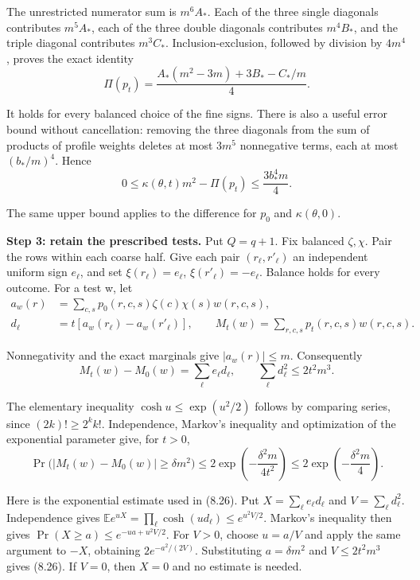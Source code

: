 \documentclass[english,11pt,a4paper]{article}
\begin{document}
The unrestricted numerator sum is \(m^6A_*\). Each of the three single diagonals contributes \(m^5A_*\), each of the three double diagonals contributes \(m^4B_*\), and the triple diagonal contributes \(m^3C_*\). Inclusion-exclusion, followed by division by \(4m^4\), proves the exact identity
\[\Pi(p_t)=\frac{A_*(m^2-3m)+3B_*-C_*/m}{4}.                 \tag{8.23}\]

It holds for every balanced choice of the fine signs. There is also a useful error bound without cancellation: removing the three diagonals from the sum of products of profile weights deletes at most \(3m^5\) nonnegative terms, each at most \((b_*/m)^4\). Hence
\[0\leq\kappa(\theta,t)m^2-\Pi(p_t)\leq\frac{3b_*^4m}{4}.    \tag{8.24}\]

The same upper bound applies to the difference for \(p_0\) and \(\kappa(\theta,0)\).

\textbf{Step 3: retain the prescribed tests.} Put \(Q=q+1\). Fix balanced \(\zeta,\chi\). Pair the rows within each coarse half. Give each pair \((r_\ell,r'_\ell)\) an independent uniform sign \(e_\ell\), and set \(\xi(r_\ell)=e_\ell\), \(\xi(r'_\ell)=-e_\ell\). Balance holds for every outcome. For a test w, let
\[\begin{aligned}
a_w(r)&=\sum_{c,s}p_0(r,c,s)\zeta(c)\chi(s)w(r,c,s),\\
d_\ell&=t[a_w(r_\ell)-a_w(r'_\ell)],\qquad
M_t(w)=\sum_{r,c,s}p_t(r,c,s)w(r,c,s).
\end{aligned}\]

Nonnegativity and the exact marginals give \(|a_w(r)|\leq m\). Consequently
\[M_t(w)-M_0(w)=\sum_\ell e_\ell d_\ell,\qquad
\sum_\ell d_\ell^2\leq2t^2m^3.                              \tag{8.25}\]

The elementary inequality \(\cosh u\leq\exp(u^2/2)\) follows by comparing series, since \((2k)!\geq2^k k!\). Independence, Markov's inequality and optimization of the exponential parameter give, for \(t>0\),
\[\Pr\bigl(|M_t(w)-M_0(w)|\geq\delta m^2\bigr)
\leq2\exp\left(-\frac{\delta^2m}{4t^2}\right)
\leq2\exp\left(-\frac{\delta^2m}{4}\right).                  \tag{8.26}\]

Here is the exponential estimate used in (8.26). Put \(X=\sum_\ell e_\ell d_\ell\) and \(V=\sum_\ell d_\ell^2\). Independence gives \(\mathbb E e^{uX}=\prod_\ell\cosh(ud_\ell)\leq e^{u^2V/2}\). Markov's inequality then gives \(\Pr(X\geq a)\leq e^{-ua+u^2V/2}\). For \(V>0\), choose \(u=a/V\) and apply the same argument to \(-X\), obtaining \(2e^{-a^2/(2V)}\). Substituting \(a=\delta m^2\) and \(V\leq2t^2m^3\) gives (8.26). If \(V=0\), then \(X=0\) and no estimate is needed.
\end{document}
